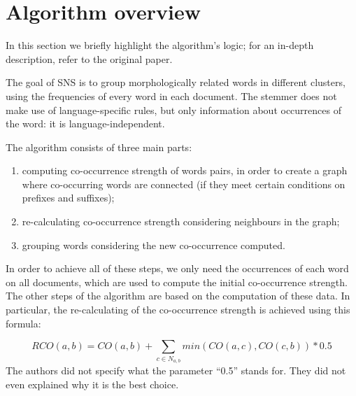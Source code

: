 \section{Algorithm overview}
    In this section we briefly highlight the algorithm's logic; for an in-depth description, refer to the original paper\cite{sns}.
 
    The goal of SNS is to group morphologically related words in different clusters, using the frequencies of every word in each document. The stemmer does not make use of language-specific rules, but only information about occurrences of the word: it is language-independent.
    
The algorithm consists of three main parts:

    \begin{enumerate}
        \item computing co-occurrence strength of words pairs, in order to create a graph where co-occurring words are connected (if they meet certain conditions on prefixes and suffixes);
        \item re-calculating co-occurrence strength considering neighbours in the graph;
        \item grouping words considering the new co-occurrence computed.
    \end{enumerate}

    In order to achieve all of these steps, we only need the occurrences of each word on all documents, which are used to compute the initial co-occurrence strength. The other steps of the algorithm are based on the computation of these data. In particular, the re-calculating of the co-occurrence strength is achieved using this formula:
    
    \begin{equation}
		RCO(a,b) = CO(a,b) + \sum_{c \in N_{a,b}}min(CO(a,c), CO(c, b)) * 0.5    
    \end{equation}
    The authors did not specify what the parameter ``0.5'' stands for. They did not even explained why it is the best choice.
